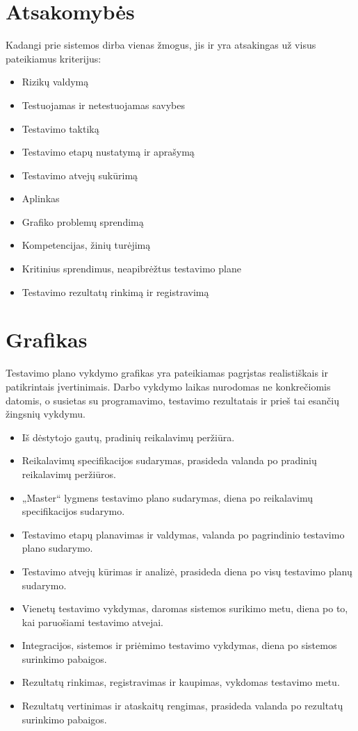 \documentclass{VUMIFPSkursinis}
\begin{document}
    \section{Atsakomybės}

    Kadangi prie sistemos dirba vienas žmogus, jis ir yra atsakingas už visus pateikiamus kriterijus: 

    \begin{itemize}
    	\item Rizikų valdymą
    	\item Testuojamas ir netestuojamas savybes
    	\item Testavimo taktiką
    	\item Testavimo etapų nustatymą ir aprašymą
    	\item Testavimo atvejų sukūrimą
    	\item Aplinkas
    	\item Grafiko problemų sprendimą
    	\item Kompetencijas, žinių turėjimą
    	\item Kritinius sprendimus, neapibrėžtus testavimo plane
    	\item Testavimo rezultatų rinkimą ir registravimą
    \end{itemize}

    \section{Grafikas}

    Testavimo plano vykdymo grafikas yra pateikiamas pagrįstas realistiškais ir patikrintais įvertinimais.
    Darbo vykdymo laikas nurodomas ne konkrečiomis datomis, o susietas su programavimo, testavimo rezultatais ir prieš tai esančių žingsnių vykdymu.

    \begin{itemize}
    	\item Iš dėstytojo gautų, pradinių reikalavimų peržiūra.
    	\item Reikalavimų specifikacijos sudarymas, prasideda valanda po pradinių reikalavimų peržiūros.
    	\item „Master“ lygmens testavimo plano sudarymas, diena po reikalavimų specifikacijos sudarymo.
    	\item Testavimo etapų planavimas ir valdymas, valanda po pagrindinio testavimo plano sudarymo.
    	\item Testavimo atvejų kūrimas ir analizė, prasideda diena po visų testavimo planų sudarymo.
    	\item Vienetų testavimo vykdymas, daromas sistemos surikimo metu, diena po to, kai paruošiami testavimo atvejai.
    	\item Integracijos, sistemos ir priėmimo testavimo vykdymas, diena po sistemos surinkimo pabaigos.
    	\item Rezultatų rinkimas, registravimas ir kaupimas, vykdomas testavimo metu.
    	\item Rezultatų vertinimas ir ataskaitų rengimas, prasideda valanda po rezultatų surinkimo pabaigos.
    \end{itemize}
\end{document}
